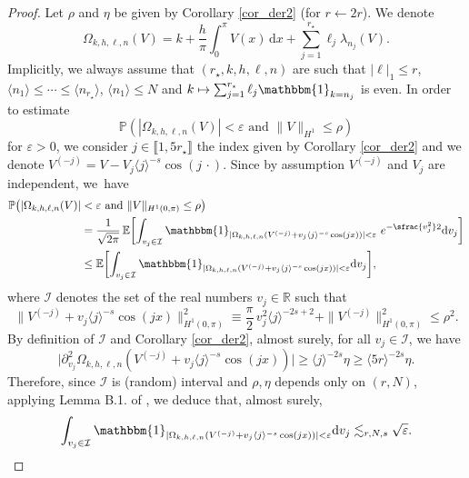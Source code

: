\documentclass[JEP,XML,SOM,Unicode,NoEqCountersInSection,published]{cedram}
\newcommand\mto{\mathchoice{\longmapsto}{\mapsto}{\mapsto}{\mapsto}}
\theoremstyle{definition}
\begin{document}
\begin{proof} Let $\rho$ and $\eta$ be given by Corollary \ref{cor_der2} (for $r\leftarrow 2r$). We denote
\[
\Omega_{k,h,\ell,n}(V)=k+\frac{h}\pi \int_0^\pi V(x) \, \mathrm{d}x + \sum_{j=1}^{r_\star} \ell_j \lambda_{n_j}(V).
\]
Implicitly, we always assume that $(r_\star,k,h,\ell,n)$ are such that $|\ell|_1 \!\leq\! r$, $\langle n_1 \rangle \!\leq\! \cdots \!\leq\! \langle n_{r_\star} \rangle$, $\langle n_1 \rangle \!\leq\! N$ and $ k \mto \sum_{j=1}^{r_\star} \ell_j \mathbbm{1}_{ k = n_j } $ is even. In order to estimate
\[
\mathbb{P}(|\Omega_{k,h,\ell,n}(V)| < \varepsilon \text{ and } \|V\|_{H^1} \!\leq\! \rho)
\]
for $\varepsilon>0$, we consider $j\in \llbracket 1,5r_\star \rrbracket$ the index given by Corollary \ref{cor_der2} and we denote $V^{(-j)}=V - V_j \langle j\rangle^{-s} \cos(j \, \cdot)$. Since by assumption $V^{(-j)}$ and $V_j$ are independent, we~have
\begin{equation}
\label{eq_J_reviendrai_2}
\begin{split}
\mathbb{P}\big(|\Omega_{k,h,\ell,n}(V)| &< \varepsilon \ \text{and} \ \| V\|_{H^1(0,\pi)} \leq \rho \big) \\
&= \frac1{\sqrt{2\pi}}\,\mathbb{E} \biggl[\int_{v_{j} \in \mathcal{I}} \mathbbm{1}_{|\Omega_{k,h,\ell,n}(V^{(-j)}+ v_{j} \langle j \rangle^{-s} \cos(jx))| < \varepsilon } \ e^{-\sfrac{v_{j}^2}2}\mathrm{d}v_{j} \biggr] \\
&\leq \mathbb{E} \biggl[\int_{v_{j} \in \mathcal{I}} \mathbbm{1}_{|\Omega_{k,h,\ell,n}(V^{(-j)}+ v_{j} \langle j \rangle^{-s} \cos(jx))| < \varepsilon } \mathrm{d}v_{j} \biggr],
\end{split}
\end{equation}
where $\mathcal{I}$ denotes the set of the real numbers $v_j \in \mathbb{R}$ such that
\[
\bigl\| V^{(-j)}+ v_{j} \langle j \rangle^{-s} \cos(jx) \|_{H^1(0,\pi)}^2 \equiv \frac{\pi}2\, v_{j}^2 \langle j \rangle^{-2s+2} + \| V^{(-j)}\bigr\|_{H^1(0,\pi)}^2 \leq \rho^2.
\]
By definition of $\mathcal{I}$ and Corollary \ref{cor_der2}, almost surely, for all $v_j \in \mathcal{I}$, we have
\[
\bigl|\partial_{v_j}^2 \Omega_{k,h,\ell,n}(V^{(-j)}+ v_{j} \langle j \rangle^{-s} \cos(jx))\bigr| \geq \langle j \rangle^{-2s} \eta \geq \langle 5r \rangle^{-2s} \eta.
\]
Therefore, since $\mathcal{I}$ is (random) interval and $\rho,\eta$ depends only on $(r,N)$, applying Lemma B.1. of \cite{Eli}, we deduce that, almost surely,
\[
\int_{v_{j} \in \mathcal{I}} \mathbbm{1}_{|\Omega_{k,h,\ell,n}(V^{(-j)}+ v_{j} \langle j \rangle^{-s} \cos(jx))| < \varepsilon } \mathrm{d}v_{j} \lesssim_{r,N,s} \sqrt{\varepsilon}.
\]
\end{proof}
\end{document}
